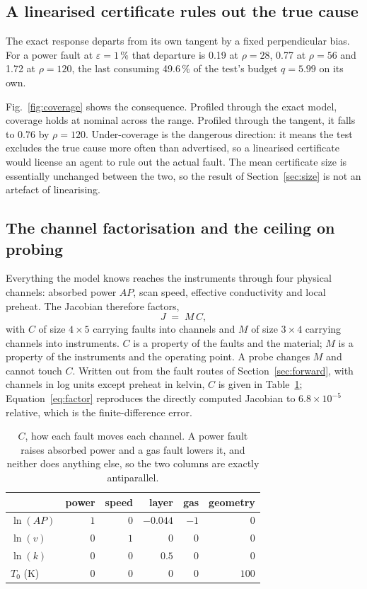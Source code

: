 \documentclass[preprint,12pt]{elsarticle}
\begin{document}
\subsection{A linearised certificate rules out the true cause}
\label{sec:exactresult}

The exact response departs from its own tangent by a fixed perpendicular bias.
For a power fault at $\varepsilon = 1\,\%$ that departure is 0.19 at
$\rho = 28$, 0.77 at $\rho = 56$ and 1.72 at $\rho = 120$, the last consuming
49.6\,\% of the test's budget $q = 5.99$ on its own.

Fig.~\ref{fig:coverage} shows the consequence. Profiled through the exact model,
coverage holds at nominal across the range. Profiled through the tangent, it
falls to 0.76 by $\rho = 120$. Under-coverage is the dangerous direction: it
means the test excludes the true cause more often than advertised, so a
linearised certificate would license an agent to rule out the actual fault. The
mean certificate size is essentially unchanged between the two, so the result of
Section~\ref{sec:size} is not an artefact of linearising.

\subsection{The channel factorisation and the ceiling on probing}
\label{sec:probe}

Everything the model knows reaches the instruments through four physical
channels: absorbed power $AP$, scan speed, effective conductivity and local
preheat. The Jacobian therefore factors,
%
\begin{equation}
J \;=\; M\,C ,
\label{eq:factor}
\end{equation}
%
with $C$ of size $4 \times 5$ carrying faults into channels and $M$ of size
$3 \times 4$ carrying channels into instruments. $C$ is a property of the faults
and the material; $M$ is a property of the instruments and the operating point.
A probe changes $M$ and cannot touch $C$. Written out from the fault routes of
Section~\ref{sec:forward}, with channels in log units except preheat in kelvin,
$C$ is given in Table~\ref{tab:C}; Equation~\eqref{eq:factor} reproduces the
directly computed Jacobian to $6.8\times10^{-5}$ relative, which is the
finite-difference error.

\begin{table}[htbp]
\centering
\caption{$C$, how each fault moves each channel. A power fault raises absorbed
power and a gas fault lowers it, and neither does anything else, so the two
columns are exactly antiparallel.}
\label{tab:C}
\begin{tabular}{@{}lrrrrr@{}}
\toprule
 & power & speed & layer & gas & geometry \\
\midrule
$\ln(AP)$      & $1$ & $0$ & $-0.044$ & $-1$ & $0$ \\
$\ln(v)$       & $0$ & $1$ & $0$      & $0$  & $0$ \\
$\ln(k)$       & $0$ & $0$ & $0.5$    & $0$  & $0$ \\
$T_0$ (K)      & $0$ & $0$ & $0$      & $0$  & $100$ \\
\bottomrule
\end{tabular}
\end{table}
\end{document}
